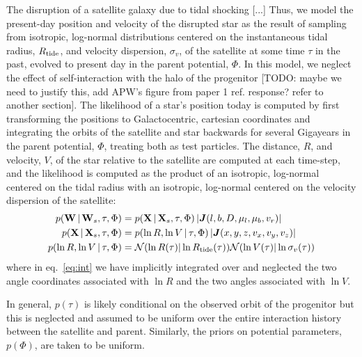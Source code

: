 \documentclass[letterpaper,12pt,preprint]{aastex}
\newcommand{\given}{\,|\,}
\newcommand{\jac}[1]{\left\vert \J{#1} \right\vert}
\newcommand{\D}{{\bf D}}
\newcommand{\W}{{\bf W}}
\newcommand{\X}{{\bf X}}
\newcommand{\J}{{\boldsymbol J}}
\newcommand{\rtide}{R_{\rm tide}}
\begin{document}
The disruption of a satellite galaxy due to tidal shocking [...] Thus, we model the present-day position and velocity of the disrupted star as the result of sampling from isotropic, log-normal distributions centered on the instantaneous tidal radius, $R_{\rm tide}$, and velocity dispersion, $\sigma_v$, of the satellite at some time $\tau$ in the past, evolved to present day in the parent potential, $\Phi$. In this model, we neglect the effect of self-interaction with the halo of the progenitor [TODO: maybe we need to justify this, add APW's figure from paper 1 ref. response? refer to another section]. The likelihood of a star's position today is computed by first transforming the positions to Galactocentric, cartesian coordinates and integrating the orbits of the satellite and star backwards for several Gigayears in the parent potential, $\Phi$, treating both as test particles. The distance, $R$, and velocity, $V$, of the star relative to the satellite are computed at each time-step, and the likelihood is computed as the product of an isotropic, log-normal centered on the tidal radius with an isotropic, log-normal centered on the velocity dispersion of the satellite:
\begin{align}
	p(\W \given \W_s, \tau, \Phi) &= p(\X \given \X_s, \tau, \Phi) \jac{(l,b,D,\mu_l,\mu_b,v_r)}\\
	p(\X \given \X_s, \tau, \Phi) &= p(\ln R, \ln V \given \tau, \Phi) \jac{(x,y,z,v_x,v_y,v_z)}\label{eq:int} \\
	p(\ln R, \ln V \given \tau, \Phi) &= \mathcal{N}(\ln R(\tau) | \ln \rtide(\tau))\mathcal{N}(\ln V(\tau) | \ln \sigma_v(\tau))
\end{align}
where in eq.~\ref{eq:int} we have implicitly integrated over and neglected the two angle coordinates associated with $\ln R$ and the two angles associated with $\ln V$.


In general, $p(\tau)$ is likely conditional on the observed orbit of the progenitor but this is neglected and assumed to be uniform over the entire interaction history between the satellite and parent. Similarly, the priors on potential parameters, $p(\Phi)$, are taken to be uniform.
\end{document}
